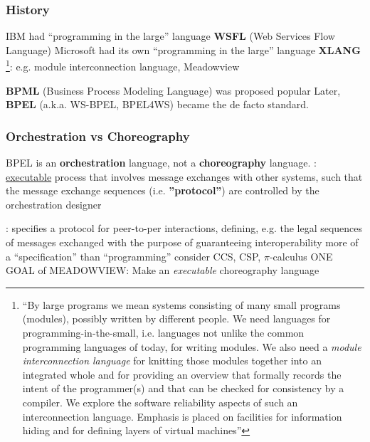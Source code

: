 \documentclass{note}
\begin{document}
\subsubsection{History}
\bit
\w IBM had ``programming in the large'' language \textcolor{red2}{\bf{}WSFL} (Web Services Flow
Language)
\w Microsoft had its own ``programming in the large'' language
\textcolor{red2}{\bf{}XLANG} 
\bit
\w {}\footnote{``By large programs we mean systems consisting of many small programs
  (modules), possibly written by different people. We need languages for
  programming-in-the-small, i.e. languages not unlike the common programming
  languages of today, for writing modules. We also need a {\em module
  interconnection language\/} for knitting those modules together into an
  integrated whole and for providing an overview that formally records the
  intent of the programmer(s) and that can be checked for consistency by a
  compiler. We explore the software reliability aspects of such an
  interconnection language. Emphasis is placed on facilities for information
  hiding and for defining layers of virtual machines''}: e.g. module
interconnection language, Meadowview
  \eit

\w \textcolor{red2}{\bf{}BPML} (Business Process Modeling Language) was proposed
popular 
\w Later, \textcolor{red2}{\bf{}BPEL} (a.k.a. WS-BPEL, BPEL4WS) became the de
facto standard. 
\eit

\subsubsection{Orchestration vs Choreography}
   \bit
   \w \textcolor{blue2}{BPEL is an {\bf{}orchestration} language, not a {\bf
    choreography} language}. 
   \w {}: \underline{executable} process that involves message exchanges
   with other systems, such that the message exchange sequences
   (i.e. \textcolor{red2}{\bf{}''protocol''}) are controlled by the
   orchestration designer

   \w {}: specifies a protocol for peer-to-per interactions,
   defining, e.g. the legal sequences of messages exchanged with the purpose
   of guaranteeing interoperability
        \bit
        \w more of a ``specification'' than ``programming''
        \w consider CCS, CSP, $\pi$-calculus
        \w {}
        \w \textcolor{red2}{ONE GOAL of MEADOWVIEW: Make an {\em executable\/}
          choreography language} 
        \eit
   \eit
\end{document}
